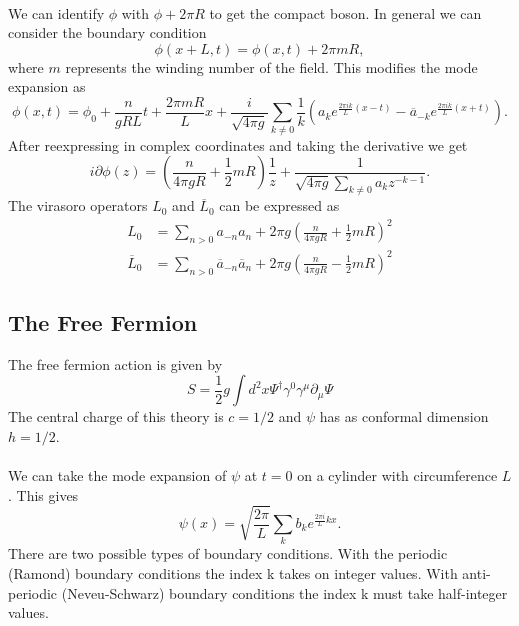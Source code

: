 \documentclass[submission, PhysLectNotes]{SciPost}
\begin{document}
\\
We can identify $\phi$ with $\phi+2\pi R$ to get the compact boson. In general we can consider the boundary condition
\begin{equation}
  \phi(x+L,t) = \phi(x,t) + 2\pi m R,
\end{equation}
where $m$ represents the winding number of the field. This modifies the mode expansion as
\begin{equation}
  \phi(x,t) = \phi_0 + \frac{n}{gRL}t + \frac{2\pi m R}{L}x + \frac{i}{\sqrt{4\pi g}}\sum_{k\neq 0}\frac{1}{k}\left(a_k e^{\frac{2\pi i k}{L}(x-t)}-\overline{a}_{-k}e^{\frac{2\pi i k}{L}(x+t)}\right).
\end{equation}
After reexpressing in complex coordinates and taking the derivative we get
\begin{equation}
  i\partial\phi(z) = (\frac{n}{4\pi g R}+\frac{1}{2}mR)\frac{1}{z}+\frac{1}{\sqrt{4\pi g}\sum_{k\neq 0}a_k z^{-k-1}}.
\end{equation}
The virasoro operators $L_0$ and $\overline{L}_0$ can be expressed as
\begin{align}
  L_0 &= \sum_{n>0}a_{-n}a_n + 2\pi g {\left(\frac{n}{4\pi g R}+\frac{1}{2}mR\right)}^2\\
  \overline{L}_0 &= \sum_{n>0}\overline{a}_{-n}\overline{a}_n + 2\pi g {\left(\frac{n}{4\pi g R}-\frac{1}{2}mR\right)}^2
\end{align}

\subsection{The Free Fermion}
The free fermion action is given by
\begin{equation}
  S = \frac{1}{2}g\int d^2 x \Psi^\dagger\gamma^0\gamma^\mu\partial_\mu\Psi
\end{equation}
The central charge of this theory is $c=1/2$ and $\psi$ has as conformal dimension $h=1/2$.\\

\\
We can take the mode expansion of $\psi$ at $t=0$ on a cylinder with circumference $L$. This gives
\begin{equation}
  \psi(x) = \sqrt{\frac{2\pi}{L}}\sum_k b_k e^{\frac{2\pi i}{L}k x}.
\end{equation}
There are two possible types of boundary conditions. With the periodic (Ramond) boundary conditions the index k takes on integer values. With anti-periodic (Neveu-Schwarz) boundary conditions the index k must take half-integer values.
\end{document}
